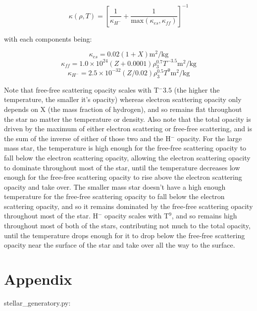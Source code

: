 \documentclass[11pt]{article}
\begin{document}
\begin{equation}
\kappa(\rho, T) = \left[\frac{1}{\kappa_{H^-}} + \frac{1}{\text{max}(\kappa_{es}, \kappa_{ff})}\right]^{-1}
\end{equation} \label{f_rho}

with each components being:

\begin{equation}
\kappa_{es} = 0.02(1+X)\text{m}^2\text{/kg}
\end{equation} \label{f_rho}
\begin{equation}
\kappa_{ff} = 1.0\times10^{24}(Z+0.0001)\rho_{3}^{0.7} T^{-3.5}\text{m}^2\text{/kg}
\end{equation} \label{f_rho}
\begin{equation}
\kappa_{H^-} = 2.5\times10^{-32}(Z/0.02)\rho_{3}^{0.5} T^{9}\text{m}^2\text{/kg}
\end{equation} \label{f_rho}

\cite{manual}Note that free-free scattering opacity scales with T$^-3.5$ (the higher the temperature, the smaller it's opacity) whereas electron scattering opacity only depends on X (the mass fraction of hydrogen), and so remains flat throughout the star no matter the temperature or density. Also note that the total opacity is driven by the maximum of either electron scattering or free-free scattering, and is the sum of the inverse of either of those two and the H$^-$ opacity. For the large mass star, the temperature is high enough for the free-free scattering opacity to fall below the electron scattering opacity, allowing the electron scattering opacity to dominate throughout most of the star, until the temperature decreases low enough for the free-free scattering opacity to rise above the electron scattering opacity and take over. The smaller mass star doesn't have a high enough temperature for the free-free scattering opacity to fall below the electron scattering opacity, and so it remains dominated by the free-free scattering opacity throughout most of the star. H$^-$ opacity scales with T$^9$, and so remains high throughout most of both of the stars, contributing not much to the total opacity, until the temperature drops enough for it to drop below the free-free scattering opacity near the surface of the star and take over all the way to the surface.

\newpage

\section{Appendix}\label{appendix}
stellar\_generatory.py:

\end{document}
